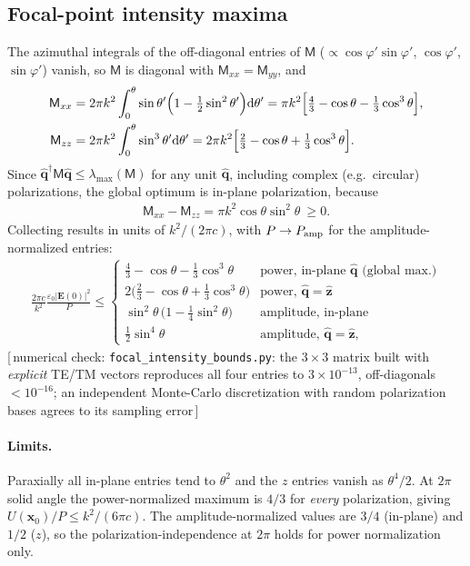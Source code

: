 \documentclass[11pt,letterpaper]{article}
\newcommand{\vect}[1]{\mathbf{#1}}
\newcommand{\Ev}{\vect{E}}
\newcommand{\xv}{\vect{x}}
\newcommand{\qhat}{\hat{\vect{q}}}
\newcommand{\zhat}{\hat{\vect{z}}}
\newcommand{\code}[1]{\texttt{\small #1}}
\newcommand{\numcheck}[1]{\hfill{\small\color{green!40!black}[\,numerical check: #1\,]}}
\begin{document}
\subsection{Focal-point intensity maxima}
The azimuthal integrals of the off-diagonal entries of $\mathsf{M}$ ($\propto\cos\varphi'\sin\varphi'$, $\cos\varphi'$, $\sin\varphi'$) vanish, so $\mathsf{M}$ is diagonal with $\mathsf{M}_{xx}=\mathsf{M}_{yy}$, and
\begin{align}
    \mathsf{M}_{xx} &= 2\pi k^2\int_0^\theta\sin\theta'\Big(1-\tfrac12\sin^2\theta'\Big){\rm d}\theta' = \pi k^2\Big[\tfrac43-\cos\theta-\tfrac13\cos^3\theta\Big], \nonumber\\
    \mathsf{M}_{zz} &= 2\pi k^2\int_0^\theta\sin^3\theta'{\rm d}\theta' = 2\pi k^2\Big[\tfrac23-\cos\theta+\tfrac13\cos^3\theta\Big].
\end{align}
Since $\qhat^\dagger\mathsf{M}\qhat\le\lambda_{\max}(\mathsf{M})$ for any unit $\qhat$, including complex (e.g.\ circular) polarizations, the global optimum is in-plane polarization, because
\begin{align}
    \mathsf{M}_{xx}-\mathsf{M}_{zz}=\pi k^2\cos\theta\sin^2\theta\ \ge 0.
\end{align}
Collecting results in units of $k^2/(2\pi c)$, with $P\to P_{\rm amp}$ for the amplitude-normalized entries:
\begin{align}
    \frac{2\pi c}{k^2}\frac{\varepsilon_0|\Ev(0)|^2}{P}\le
    \begin{cases}
        \tfrac43-\cos\theta-\tfrac13\cos^3\theta & \text{power, in-plane } \qhat \text{ (global max.)}\\[2pt]
        2\big(\tfrac23-\cos\theta+\tfrac13\cos^3\theta\big) & \text{power, } \qhat=\zhat\\[2pt]
        \sin^2\theta\,\big(1-\tfrac14\sin^2\theta\big) & \text{amplitude, in-plane}\\[2pt]
        \tfrac12\sin^4\theta & \text{amplitude, } \qhat=\zhat,
    \end{cases}
    \label{eq:bounds}
\end{align}
\numcheck{\code{focal\_intensity\_bounds.py}: the $3\times3$ matrix built with \emph{explicit} TE/TM vectors reproduces all four entries to $3\times10^{-13}$, off-diagonals $<10^{-16}$; an independent Monte-Carlo discretization with random polarization bases agrees to its sampling error}

\paragraph{Limits.} Paraxially all in-plane entries tend to $\theta^2$ and the $z$ entries vanish as $\theta^4/2$. At $2\pi$ solid angle the power-normalized maximum is $4/3$ for \emph{every} polarization, giving $U(\xv_0)/P\le k^2/(6\pi c)$. The amplitude-normalized values are $3/4$ (in-plane) and $1/2$ ($z$), so the polarization-independence at $2\pi$ holds for power normalization only.
\end{document}
